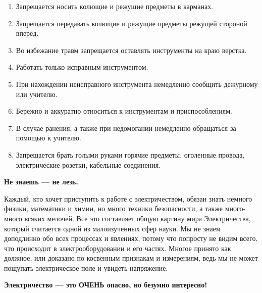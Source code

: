 \begin{enumerate}
 выполнять указания учителя.
 к одежде:
\begin{enumerate}
\item одежда должна быть без внешних разрывов; 
\item должна быть в прилежном состоянии, иметь все
пуговицы и т.д.
\end{enumerate}
\item Запрещается носить колющие и режущие предметы в
карманах.

\item Запрещается передавать колющие и режущие предметы
режущей стороной вперёд.

\item Во избежание травм запрещается оставлять инструменты на
краю верстка.

\item Работать только исправным инструментом.

\item При нахождении неисправного инструмента немедленно
сообщить дежурному или учителю.

\item Бережно и аккуратно относиться к инструментам и
приспособлениям.
\item В случае ранения, а также при недомогании немедленно
обращаться за помощью к учителю.

\item Запрещается брать голыми руками горячие предметы,
оголенные провода, электрические розетки, кабельные
соединения.
\end{enumerate}



\textbf{Не знаешь — не лезь.}

Каждый, кто хочет приступить к работе с
электричеством,
обязан знать немного физики, математики и химии,
но много
техники безопасности, а также много-много всяких
мелочей.
Все это составляет общую картину мира
Электричества, который считается одной из малоизученных сфер науки.
Мы не
знаем доподлинно обо всех процессах и явлениях,
потому что
попросту не видим всего, что происходит в
электрооборудовании и его частях.
Многое принято как должное, или доказано по
косвенным
признакам и измерениям, ведь мы не может
пощупать электрическое поле и увидеть напряжение.

\textbf{Электричество — это ОЧЕНЬ опасно, но безумно интересно!}

\newpage